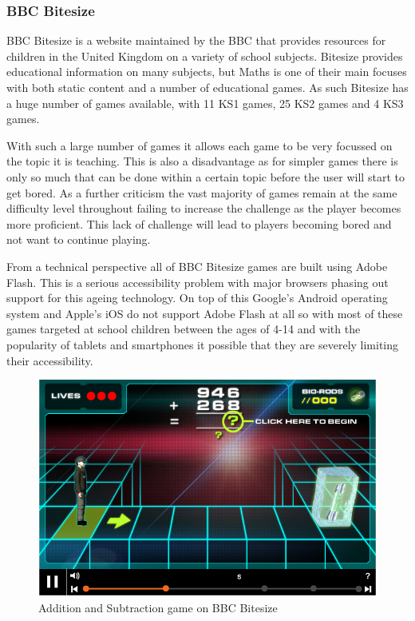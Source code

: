 \documentclass[12pt,a4paper]{report}
\begin{document}
\subsubsection{BBC Bitesize}
BBC Bitesize is a website maintained by the BBC that provides resources for children in the United Kingdom on a variety of school subjects. Bitesize provides educational information on many subjects, but Maths is one of their main focuses with both static content and a number of educational games. As such Bitesize has a huge number of games available, with 11 KS1 games, 25 KS2 games and 4 KS3 games.

With such a large number of games it allows each game to be very focussed on the topic it is teaching. This is also a disadvantage as for simpler games there is only so much that can be done within a certain topic before the user will start to get bored. As a further criticism the vast majority of games remain at the same difficulty level throughout failing to increase the challenge as the player becomes more proficient. This lack of challenge will lead to players becoming bored and not want to continue playing. 

From a technical perspective all of BBC Bitesize games are built using Adobe Flash. This is a serious accessibility problem with major browsers phasing out support for this ageing technology. On top of this Google's Android operating system and Apple's iOS do not support Adobe Flash at all so with most of these games targeted at school children between the ages of 4-14 and with the popularity of tablets and smartphones it possible that they are severely limiting their accessibility.

\begin{figure}[!tbp]
  \centering
  \begin{minipage}[b]{1\textwidth}
    \includegraphics[width=\textwidth]{BBCBitesize}
    \caption{Addition and Subtraction game on BBC Bitesize}
  \end{minipage}
\end{figure}
\FloatBarrier
\end{document}
